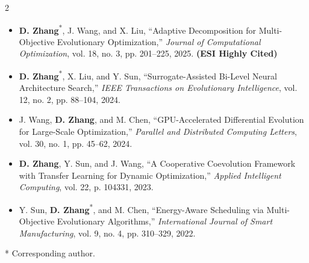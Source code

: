 \begin{paracol}{2}
\begin{rightcolumn}

\begin{itemize}[leftmargin=*]
	\itemsep 1.5pt
	\item \textbf{D. Zhang}\textsuperscript{*}, J. Wang, and X. Liu, ``Adaptive Decomposition for Multi-Objective Evolutionary Optimization,'' \textit{Journal of Computational Optimization}, vol. 18, no. 3, pp. 201--225, 2025. \textbf{(ESI Highly Cited)}
	\item \textbf{D. Zhang}\textsuperscript{*}, X. Liu, and Y. Sun, ``Surrogate-Assisted Bi-Level Neural Architecture Search,'' \textit{IEEE Transactions on Evolutionary Intelligence}, vol. 12, no. 2, pp. 88--104, 2024.
	\item J. Wang, \textbf{D. Zhang}, and M. Chen, ``GPU-Accelerated Differential Evolution for Large-Scale Optimization,'' \textit{Parallel and Distributed Computing Letters}, vol. 30, no. 1, pp. 45--62, 2024.
	\item \textbf{D. Zhang}, Y. Sun, and J. Wang, ``A Cooperative Coevolution Framework with Transfer Learning for Dynamic Optimization,'' \textit{Applied Intelligent Computing}, vol. 22, p. 104331, 2023.
	\item Y. Sun, \textbf{D. Zhang}\textsuperscript{*}, and M. Chen, ``Energy-Aware Scheduling via Multi-Objective Evolutionary Algorithms,'' \textit{International Journal of Smart Manufacturing}, vol. 9, no. 4, pp. 310--329, 2022.
\end{itemize}

\vspace{2pt}
{\small \textcolor{maincol}{* Corresponding author.}}

\vspace{2pt}




\end{rightcolumn}
\end{paracol}
